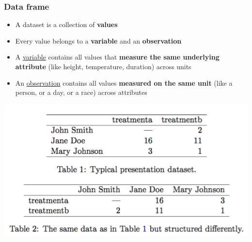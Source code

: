 \documentclass{beamer}
\begin{document}
\begin{frame}[fragile]
	\frametitle{Data frame}
	\begin{itemize}
		\small
		\item A dataset is a collection of \textbf{values}
			\pause
		\item Every value belongs to a \textbf{variable} and an \textbf{observation}
			\pause
		\item A \underline{variable} contains all values that \textbf{measure the same underlying attribute} (like height, temperature, duration) across units
			\pause
		\item An \underline{observation} contains all values \textbf{measured on the same unit} (like a person, or a day, or a race) across attributes
	\end{itemize}
	\begin{center} \includegraphics[scale=0.25]{figures/hw_tidy1.png} \end{center}
 
\end{frame}
\end{document}
